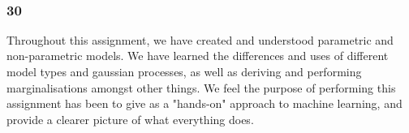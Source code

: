 \documentclass[11pt]{article}
\begin{document}
    \begin{center}
    \end{center}
    { \hspace*{\fill} \\}

    \subsubsection*{30}\label{section}

Throughout this assignment, we have created and understood parametric
and non-parametric models. We have learned the differences and uses of
different model types and gaussian processes, as well as deriving and
performing marginalisations amongst other things. We feel the purpose of
performing this assignment has been to give as a "hands-on" approach to
machine learning, and provide a clearer picture of what everything does.





    
\end{document}
